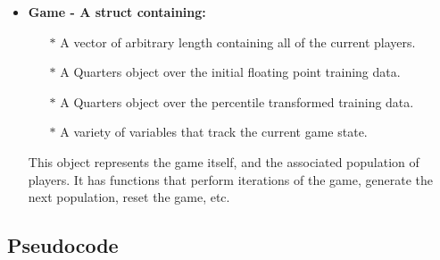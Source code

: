 \begin{itemize}
    \item \bf Game \rm - A struct containing:
    \begin{itemize}
        \item[$\ast$] A vector of arbitrary length containing all of the current players.
        \item[$\ast$] A Quarters object over the initial floating point training data.
        \item[$\ast$] A Quarters object over the percentile transformed training data.
        \item[$\ast$] A variety of variables that track the current game state.
    \end{itemize}
        This object represents the game itself, and the associated population of players. It has functions that perform iterations of the game, generate the next population, reset the game, etc.
\end{itemize}

\subsection{Pseudocode}

